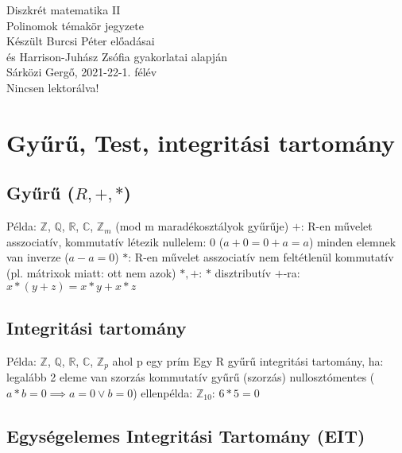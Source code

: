 \documentclass[12pt,a4paper]{article}
\begin{document}
\begin{center}
	\huge
	Diszkrét matematika II\\
	\vspace{1mm}
	\LARGE
	Polinomok témakör jegyzete\\
	\vspace{5mm}
	\large
	Készült Burcsi Péter előadásai\\
	és Harrison-Juhász Zsófia gyakorlatai alapján\\
	\vspace{5mm}
	Sárközi Gergő, 2021-22-1. félév\\
	Nincsen lektorálva!
\end{center}

\tableofcontents

\pagebreak

\section{Gyűrű, Test, integritási tartomány}

\subsection{Gyűrű ($R,+,*$)}

\begin{outline}
	\1 Példa: $\mathbb{Z}$, $\mathbb{Q}$, $\mathbb{R}$, $\mathbb{C}$, $\mathbb{Z}_m$ (mod m maradékosztályok gyűrűje)
	\1 $+$: R-en művelet
		\2 asszociatív, kommutatív
		\2 létezik nullelem: 0 ($a+0=0+a=a$)
		\2 minden elemnek van inverze ($a-a=0$)
	\1 $*$: R-en művelet
		\2 asszociatív
		\2 nem feltétlenül kommutatív (pl. mátrixok miatt: ott nem azok)
	\1 $*,+$: $*$ disztributív $+$-ra: $x*(y+z)=x*y+x*z$
\end{outline}

\subsection{Integritási tartomány}

\begin{outline}
	\1 Példa: $\mathbb{Z}$, $\mathbb{Q}$, $\mathbb{R}$, $\mathbb{C}$, $\mathbb{Z}_p$ ahol p egy prím
	\1 Egy R gyűrű integritási tartomány, ha:
		\2 legalább 2 eleme van
		\2 szorzás kommutatív
		\2 gyűrű (szorzás) nullosztómentes ($a*b=0 \implies a=0 \lor b=0$)
			\3 ellenpélda: $\mathbb{Z}_{10}$: $6*5=0$
\end{outline}

\subsection{Egységelemes Integritási Tartomány (EIT)}
\end{document}
